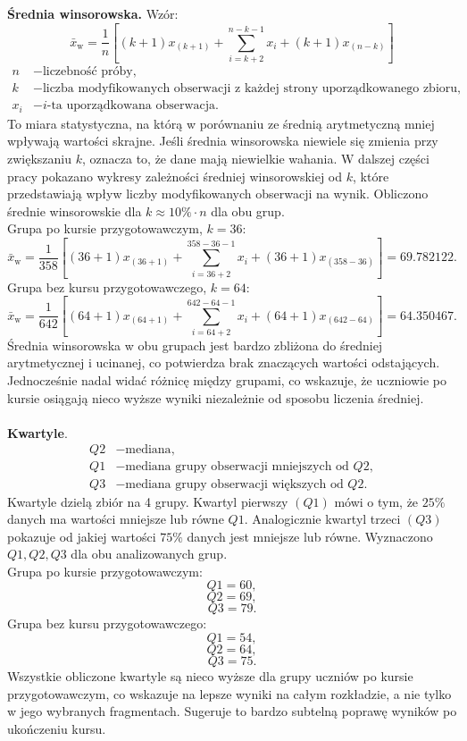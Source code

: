 \documentclass[12pt, a4paper]{article}
\begin{document}
	
	\textbf{Średnia winsorowska.} Wzór:
	\[\bar{x}_{\text{w}} =\frac{1}{n}\left[(k+1) x_{(k+1)}+ \sum_{i=k+2}^{n-k-1} x_i+ (k+1) x_{(n-k)}\right]\]
	\[
	\begin{aligned}
		n &- \text{liczebność próby},\\
		k &- \text{liczba modyfikowanych obserwacji z każdej strony uporządkowanego zbioru},\\
		x_i &- \text{$i$-ta uporządkowana obserwacja.}
	\end{aligned}
	\]
	To miara statystyczna, na którą w porównaniu ze średnią arytmetyczną mniej wpływają wartości skrajne. Jeśli średnia winsorowska niewiele się zmienia przy zwiększaniu $k$, oznacza to, że dane mają niewielkie wahania. W dalszej części pracy pokazano wykresy zależności średniej winsorowskiej od $k$, które przedstawiają wpływ liczby modyfikowanych obserwacji na wynik. Obliczono średnie winsorowskie dla $k\approx 10\% \cdot n$ dla obu grup.\\ 
	Grupa po kursie przygotowawczym, $k=36$:\\
	\[\bar{x}_{\text{w}} =\frac{1}{358}\left[(36+1) x_{(36+1)}+ \sum_{i=36+2}^{358-36-1} x_i+ (36+1) x_{(358-36)}\right]=69.782122.\]
	Grupa bez kursu przygotowawczego, $k=64$:\\
	\[\bar{x}_{\text{w}} =\frac{1}{642}\left[(64+1) x_{(64+1)}+ \sum_{i=64+2}^{642-64-1} x_i+ (64+1) x_{(642-64)}\right]=64.350467.\]
	Średnia winsorowska w obu grupach jest bardzo zbliżona do średniej arytmetycznej i ucinanej, co potwierdza brak znaczących wartości odstających. Jednocześnie nadal widać różnicę między grupami, co wskazuje, że uczniowie po kursie osiągają nieco wyższe wyniki niezależnie od sposobu liczenia średniej.\\ \\
	
	\textbf{Kwartyle}. 
	\[
	\begin{aligned}
		Q2 &- \text{mediana},\\
		Q1 &- \text{mediana grupy obserwacji mniejszych od $Q2$},\\
		Q3 &- \text{mediana grupy obserwacji większych od $Q2$.}
	\end{aligned}
	\]
	Kwartyle dzielą zbiór na 4 grupy. Kwartyl pierwszy $(Q1)$ mówi o tym, że $25\%$ danych ma wartości mniejsze lub równe $Q1$. Analogicznie kwartyl trzeci $(Q3)$ pokazuje od jakiej wartości $75\%$ danych jest mniejsze lub równe. Wyznaczono $Q1, Q2, Q3$ dla obu analizowanych grup.\\
	Grupa po kursie przygotowawczym:\\
	\[
	Q1= 60,
	\]\[
	Q2= 69,
	\]\[
	Q3= 79.
	\]
	Grupa bez kursu przygotowawczego:\\
	\[
	Q1= 54,
	\]\[
	Q2= 64,
	\]\[
	Q3= 75.
	\]
	Wszystkie obliczone kwartyle są nieco wyższe dla grupy uczniów po kursie przygotowawczym, co wskazuje na lepsze wyniki na całym rozkładzie, a nie tylko w jego wybranych fragmentach. Sugeruje to bardzo subtelną poprawę wyników po ukończeniu kursu. \\
\end{document}

